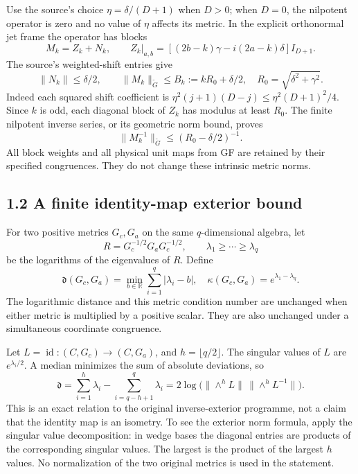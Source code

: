 \documentclass[
  11pt,
]{article}
\begin{document}
Use the source's choice \(\eta=\delta/(D+1)\) when \(D>0\); when
\(D=0\), the nilpotent operator is zero and no value of \(\eta\) affects
its metric. In the explicit orthonormal jet frame the operator has
blocks \[
M_k=Z_k+N_k,\qquad
Z_k|_{a,b}=[(2b-k)\gamma-i(2a-k)\delta]I_{D+1}.
\] The source's weighted-shift entries give \[
\|N_k\|\le\delta/2,\qquad
\|M_k\|_{\widetilde G}\le B_k:=kR_0+\delta/2,
\quad R_0=\sqrt{\delta^2+\gamma^2}. \tag{MR2}
\] Indeed each squared shift coefficient is
\(\eta^2(j+1)(D-j)\le\eta^2(D+1)^2/4\). Since \(k\) is odd, each
diagonal block of \(Z_k\) has modulus at least \(R_0\). The finite
nilpotent inverse series, or its geometric norm bound, proves \[
\|M_k^{-1}\|_{\widetilde G}\le(R_0-\delta/2)^{-1}. \tag{MR3}
\] All block weights and all physical unit maps from GF are retained by
their specified congruences. They do not change these intrinsic metric
norms.

\subsection{1.2 A finite identity-map exterior
bound}\label{a-finite-identity-map-exterior-bound}

For two positive metrics \(G_c,G_a\) on the same \(q\)-dimensional
algebra, let \[
R=G_c^{-1/2}G_aG_c^{-1/2},\qquad
\lambda_1\ge\cdots\ge\lambda_q
\] be the logarithms of the eigenvalues of \(R\). Define \[
\mathfrak d(G_c,G_a)=\min_{b\in\mathbb R}\sum_{i=1}^q|\lambda_i-b|,
\quad \kappa(G_c,G_a)=e^{\lambda_1-\lambda_q}. \tag{MR4}
\] The logarithmic distance and this metric condition number are
unchanged when either metric is multiplied by a positive scalar. They
are also unchanged under a simultaneous coordinate congruence.

Let \(L=\operatorname{id}:(C,G_c)\to(C,G_a)\), and
\(h=\lfloor q/2\rfloor\). The singular values of \(L\) are
\(e^{\lambda_i/2}\). A median minimizes the sum of absolute deviations,
so \[
\mathfrak d=\sum_{i=1}^h\lambda_i-\sum_{i=q-h+1}^q\lambda_i
=2\log\bigl(\|\wedge^hL\|\,\|\wedge^hL^{-1}\|\bigr). \tag{MR5}
\] This is an exact relation to the original inverse-exterior programme,
not a claim that the identity map is an isometry. To see the exterior
norm formula, apply the singular value decomposition: in wedge bases the
diagonal entries are products of the corresponding singular values. The
largest is the product of the largest \(h\) values. No normalization of
the two original metrics is used in the statement.
\end{document}
